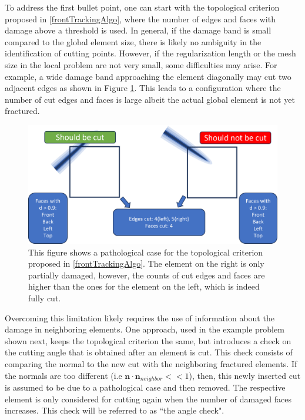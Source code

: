 To address the first bullet point, one can start with the topological criterion proposed in \ref{frontTrackingAlgo}, where the number of edges and faces with damage above a threshold is used. In general, if the damage band is small compared to the global element size, there is likely no ambiguity in the identification of cutting points. However, if the regularization length or the mesh size in the local problem are not very small, some difficulties may arise. For example, a wide damage band approaching the element diagonally may cut two adjacent edges as shown in Figure \ref{fig:pathological_case}. This leads to a configuration where the number of cut edges and faces is large albeit the actual global element is not yet fractured. 

\begin{figure}
    \centering
    \includegraphics[width=\linewidth]{Chapter4/figures/nonplanar/pathology.png}
    \caption{This figure shows a pathological case for the topological criterion proposed in \ref{frontTrackingAlgo}. The element on the right is only partially damaged, however, the counts of cut edges and faces are higher than the ones for the element on the left, which is indeed fully cut.}
    \label{fig:pathological_case}
\end{figure}%

Overcoming this limitation likely requires the use of information about the damage in neighboring elements. One approach, used in the example problem shown next, keeps the topological criterion the same, but introduces a check on the cutting angle that is obtained after an element is cut. This check consists of comparing the normal to the new cut with the neighboring fractured elements. If the normals are too different (i.e $\textbf{n}\cdot\textbf{n}_{neighbor} << 1$), then, this newly inserted cut is assumed to be due to a pathological case and then removed. The respective element is only considered for cutting again when the number of damaged faces increases. This check will be referred to as ``the angle check".

